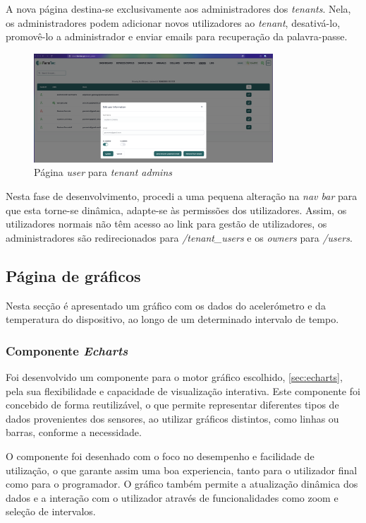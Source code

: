A nova página destina-se exclusivamente aos administradores dos \textit{tenants}. Nela, os administradores podem adicionar novos utilizadores ao \textit{tenant}, desativá-lo, promovê-lo a administrador e enviar emails para recuperação da palavra-passe.

\begin{figure}[h!]
    \centering
    \includegraphics[width=0.8\textwidth]{figs/userAdmin.png}
    \caption{Página \textit{user} para \textit{tenant admins}}
    \label{fig:user-Admin}
\end{figure}

Nesta fase de desenvolvimento, procedi a uma pequena alteração na \textit{nav bar} para que esta torne-se dinâmica, adapte-se às permissões dos utilizadores. Assim, os utilizadores normais não têm acesso ao link para gestão de utilizadores, os administradores são redirecionados para \textit{/tenant\_users} e os \textit{owners} para \textit{/users}.

\clearpage
\subsection{Página de gráficos} %

Nesta secção é apresentado um gráfico com os dados do acelerómetro e da temperatura do dispositivo, ao longo de um determinado intervalo de tempo. 

\subsubsection{\textbf{Componente \textit{Echarts}}}
Foi desenvolvido um componente para o motor gráfico escolhido, \autoref{sec:echarts}, pela sua flexibilidade e capacidade de visualização interativa. Este componente foi concebido de forma reutilizável, o que permite representar diferentes tipos de dados provenientes dos sensores, ao utilizar gráficos distintos, como linhas ou barras, conforme a necessidade.   

O componente foi desenhado com o foco no desempenho e facilidade de utilização, o que garante assim uma boa experiencia, tanto para o utilizador final como para o programador. O gráfico também permite a atualização dinâmica dos dados e a interação com o utilizador através de funcionalidades como zoom e seleção de intervalos.

